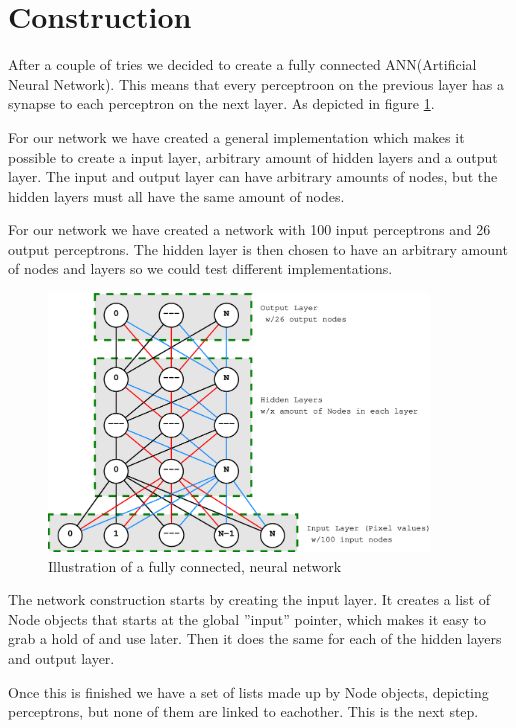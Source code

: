 \section{Construction}
After a couple of tries we decided to create a fully connected ANN(Artificial
Neural Network). This means that every perceptroon on the previous layer has a
synapse to each perceptron on the next layer. As depicted in figure
\ref{fig:ann_ex}.

For our network we have created a general implementation which makes it possible
to create a input layer, arbitrary amount of hidden layers and a output layer.
The input and output layer can have arbitrary amounts of nodes, but the hidden
layers must all have the same amount of nodes.

For our network we have created a network with 100 input perceptrons and 26
output perceptrons. The hidden layer is then chosen to have an arbitrary amount
of nodes and layers so we could test different implementations.

\begin{figure}[h]
\centering
\includegraphics[width={0.9\textwidth}]{pictures/network}
\caption{Illustration of a fully connected, neural network}
\label{fig:ann_ex}
\end{figure}

The network construction starts by creating the input layer. It creates a list of
Node objects that starts at the global ''input'' pointer, which makes it easy to
grab a hold of and use later. Then it does the same for each of the hidden
layers and output layer.

Once this is finished we have a set of lists made up by Node objects, depicting
perceptrons, but none of them are linked to eachother. This is the next step.

